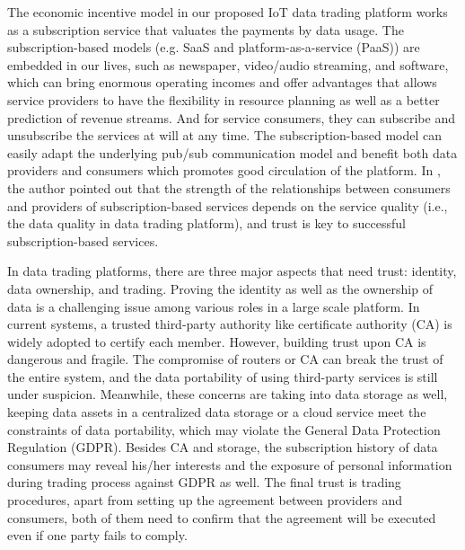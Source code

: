 \documentclass[conference]{IEEEtran}
\begin{document}
The economic incentive model in our proposed IoT data trading platform works as a subscription service that valuates the payments by data usage. The subscription-based models (e.g. SaaS and platform-as-a-service (PaaS)) are embedded in our lives, such as newspaper, video/audio streaming, and software, which can bring enormous operating incomes and offer advantages that allows service providers to have the flexibility in resource planning as well as a better prediction of revenue streams. And for service consumers, they can subscribe and unsubscribe the services at will at any time. The subscription-based model can easily adapt the underlying pub/sub communication model and benefit both data providers and consumers which promotes good circulation of the platform. In \cite{SaaS}, the author pointed out that the strength of the relationships between consumers and providers of subscription-based services depends on the service quality (i.e., the data quality in data trading platform), and trust is key to successful subscription-based services.

In data trading platforms, there are three major aspects that need trust: identity, data ownership, and trading. Proving the identity as well as the ownership of data is a challenging issue among various roles in a large scale platform. In current systems, a trusted third-party authority like certificate authority (CA) is widely adopted to certify each member. However, building trust upon CA is dangerous and fragile. The compromise of routers or CA can break the trust of the entire system, and the data portability of using third-party services is still under suspicion. Meanwhile, these concerns are taking into data storage as well, keeping data assets in a centralized data storage or a cloud service meet the constraints of data portability, which may violate the General Data Protection Regulation (GDPR)\cite{GDPR}. Besides CA and storage, the subscription history of data consumers may reveal his/her interests and the exposure of personal information during trading process against GDPR as well. The final trust is trading procedures, apart from setting up the agreement between providers and consumers, both of them need to confirm that the agreement will be executed even if one party fails to comply.
\end{document}
